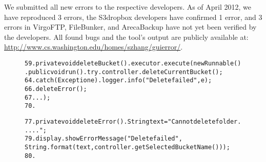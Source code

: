 We submitted all \newbugs new errors
to the respective developers. As of April 2012, 
we have reproduced 3 errors, the S3dropbox developers have confirmed
1 error, and 3 errors in VirgoFTP, FileBunker, and ArecaBackup
have not yet been verified by the developers. All found bugs
and the tool's output are publicly available at: \url{http://www.cs.washington.edu/homes/szhang/guierror/}.




\begin{figure}[t]
\hspace{4mm}{In class: com.tomczarniecki.s3.gui.DeleteBucketAction}
\vspace{-2mm}
\begin{CodeOut}
\begin{alltt}
59.private void deleteBucket() .    executor.execute(new Runnable() .        public void run() .            try .                controller.deleteCurrentBucket();
64.            {\ttrcb} catch (Exception e) .                logger.info("Delete failed", e);
66.                deleteError(); 
67.            .       .    \ttrcb);
70.\ttrcb

77.private void deleteError() .    String text = "Cannot delete folder .....";
79.    display.showErrorMessage("Delete failed", 
        String.format(text, controller.getSelectedBucketName())); 
80.\ttrcb
\end{alltt}
\end{CodeOut}
\vspace*{-15pt}
\end{figure}

